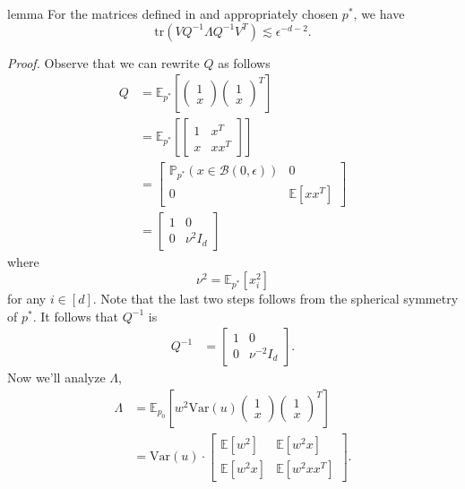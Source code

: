 \documentclass[11pt]{article}
\begin{document}
\begin{restatable}{lemma}{} \label{lemma: trace bound}
    For the matrices defined in  and appropriately chosen $p^*$, we have
    \[\text{tr}(VQ^{-1}\Lambda Q^{-1}V^T) \lesssim \epsilon^{-d-2}. \]
\end{restatable}
\noindent \textit{Proof.} Observe that we can rewrite $Q$ as follows
\begin{align}
    Q &= \mathbb{E}_{p^*}\left[\begin{pmatrix}
        1 \\ x
    \end{pmatrix}\begin{pmatrix}
        1 \\ x
    \end{pmatrix}^T\right] \\
    &= \mathbb{E}_{p^*}\left[
    \begin{bmatrix}
         1 & x^T \\
         x & xx^T
    \end{bmatrix}\right] \\
    &= \begin{bmatrix}
         \mathbb{P}_{p^*}(x \in \mathcal{B}(0, \epsilon)) & 0 \\
         0 & \mathbb{E}\left[xx^T\right]
    \end{bmatrix} \\
    &= \begin{bmatrix}
         1 & 0 \\
         0 & \nu^2I_d
    \end{bmatrix}
\end{align}
where
\[\nu^2 = \mathbb{E}_{p^*}[x_i^2]\]
for any $i \in [d]$. Note that the last two steps follows from the spherical symmetry of $p^*$. It follows that $Q^{-1}$ is
\begin{align}
    Q^{-1} &= \begin{bmatrix}
         1 & 0 \\
         0 & \nu^{-2}I_d
    \end{bmatrix}.
\end{align}
Now we'll analyze $\Lambda$, 
\begin{align}
    \Lambda &= \mathbb{E}_{p_0}\left[w^2\text{Var}(u)\begin{pmatrix}
        1 \\ x
    \end{pmatrix}\begin{pmatrix}
        1 \\ x
    \end{pmatrix}^T\right] \\
    &= 
    \text{Var}(u)\cdot\begin{bmatrix}
         \mathbb{E}[w^2] & \mathbb{E}[w^2x] \\
         \mathbb{E}[w^2x] & \mathbb{E}[w^2xx^T]
    \end{bmatrix}.
\end{align}
\end{document}
